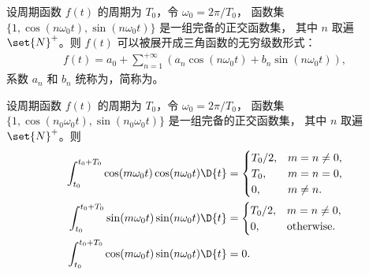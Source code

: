 \begin{definition}[三角形式傅里叶级数]
    设周期函数 $f(t)$ 的周期为 $T_0$，令 $\omega_0 = 2\pi/T_0$，
    函数集 $\{1, \cos(n\omega_0 t), \sin(n\omega_0 t)\}$ 是一组完备的正交函数集，
    其中 $n$ 取遍 $\set{N}^{+}$。则 $f(t)$ 可以被展开成三角函数的无穷级数形式：
    \begin{align*}
        f(t) = a_0 + \sum_{n = 1}^{+\infty}(a_n\cos(n\omega_0 t) + b_n\sin(n\omega_0 t)),
    \end{align*}
    系数 $a_n$ 和 $b_n$ 统称为，简称为。
\end{definition}

\begin{lemma}
    设周期函数 $f(t)$ 的周期为 $T_0$，令 $\omega_0 = 2\pi/T_0$，
    函数集 $\{1, \cos(n_0\omega_0 t), \sin(n_0\omega_0 t)\}$ 是一组完备的正交函数集，
    其中 $n$ 取遍 $\set{N}^{+}$。则
    \begin{align*}
        \int_{t_0}^{t_0 + T_0}\cos(m\omega_0 t)\cos (n\omega_0 t)\D{t} & = \begin{cases}
            T_0 / 2, & m = n \neq 0, \\
            T_0, & m = n = 0, \\
            0, & m \neq n.
        \end{cases} \\
        \int_{t_0}^{t_0 + T_0}\sin(m\omega_0 t)\sin (n\omega_0 t)\D{t} & = \begin{cases}
            T_0 / 2, & m = n \neq 0, \\
            0, & \text{otherwise}.
        \end{cases} \\
        \int_{t_0}^{t_0 + T_0}\cos(m\omega_0 t)\sin (n\omega_0 t)\D{t} & = 0.
    \end{align*}
\end{lemma}


